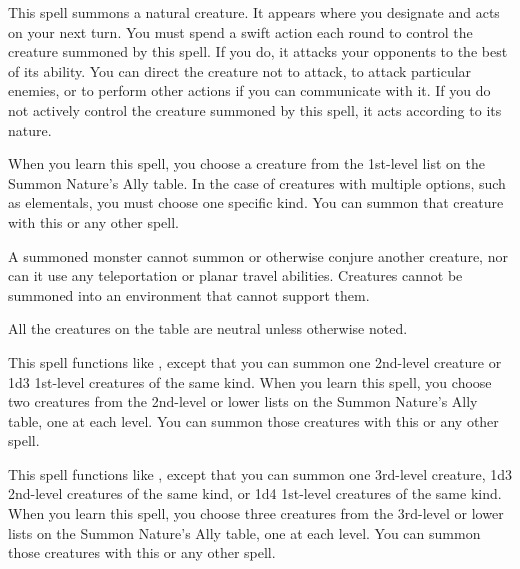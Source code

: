 \spellrng{\rngclose}
\begin{spelleffect}
  This spell summons a natural creature. It appears where you designate and acts on your next turn. You must spend a swift action each round to control the creature summoned by this spell. If you do, it attacks your opponents to the best of its ability. You can direct the creature not to attack, to attack particular enemies, or to perform other actions if you can communicate with it. If you do not actively control the creature summoned by this spell, it acts according to its nature.
  \par When you learn this spell, you choose a creature from the 1st-level list on the Summon Nature's Ally table. In the case of creatures with multiple options, such as elementals, you must choose one specific kind. You can summon that creature with this or any other  spell. 
  \par A summoned monster cannot summon or otherwise conjure another creature, nor can it use any teleportation or planar travel abilities. Creatures cannot be summoned into an environment that cannot support them.
  \par All the creatures on the table are neutral unless otherwise noted.
\end{spelleffect}

\begin{spelleffect}
  This spell functions like , except that you can summon one 2nd-level creature or 1d3 1st-level creatures of the same kind. When you learn this spell, you choose two creatures from the 2nd-level or lower lists on the Summon Nature's Ally table, one at each level. You can summon those creatures with this or any other  spell.
\end{spelleffect}

\begin{spelleffect}
  This spell functions like , except that you can summon one 3rd-level creature, 1d3 2nd-level creatures of the same kind, or 1d4 1st-level creatures of the same kind. When you learn this spell, you choose three creatures from the 3rd-level or lower lists on the Summon Nature's Ally table, one at each level. You can summon those creatures with this or any other  spell.
\end{spelleffect}

